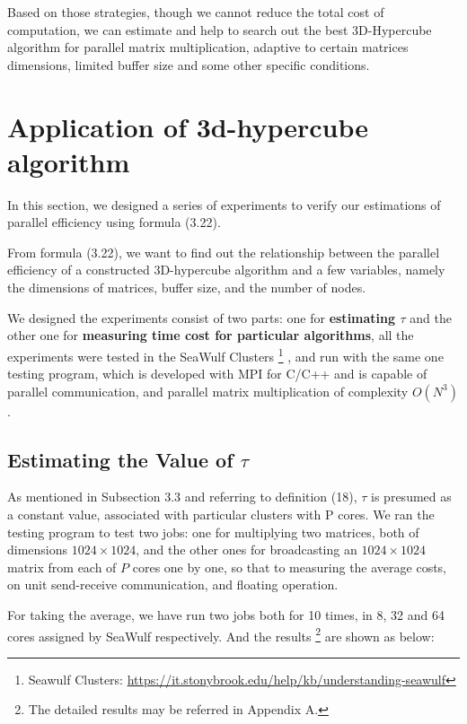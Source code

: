 \documentclass{amsart}
\theoremstyle{definition}
\theoremstyle{remark}
\numberwithin{equation}{section}
\begin{document}
\par
Based on those strategies, though we cannot reduce the total cost of computation, we can estimate and help to search out the best 3D-Hypercube algorithm for parallel matrix multiplication, adaptive to certain matrices dimensions, limited buffer size and some other specific conditions.\par


\section{Application of 3d-hypercube algorithm}
	In this section, we designed a series of experiments to verify our estimations of parallel efficiency using formula (3.22).\par
	From formula (3.22), we want to find out the relationship between the parallel efficiency of a constructed 3D-hypercube algorithm and a few variables, namely the dimensions of matrices, buffer size, and the number of nodes.\par
	We designed the experiments consist of two parts: one for \textbf{estimating $\tau$} and the other one for \textbf{measuring time cost for particular algorithms}, all the experiments were tested in the SeaWulf Clusters%
\footnote{Seawulf Clusters: \url{https://it.stonybrook.edu/help/kb/understanding-seawulf}}%
, and run with the same one testing program, which is developed with MPI for C/C++ and is capable of parallel communication, and parallel matrix multiplication of complexity $O(N^3)$.\par

\subsection{Estimating the Value of \textbf{$\tau$}}
	As mentioned in Subsection 3.3 and referring to definition (18), $\tau$ is presumed as a constant value, associated with particular clusters with P cores. We ran the testing program to test two jobs: one for multiplying two matrices, both of dimensions $1024\times 1024$, and the other ones for broadcasting an $1024\times 1024$ matrix from each of $P$ cores one by one, so that to measuring the average costs, on unit send-receive communication, and floating operation.\par
	For taking the average, we have run two jobs both for 10 times, in 8, 32 and 64 cores assigned by SeaWulf
respectively. And the results%
\footnote{The detailed results may be referred in Appendix A.}%
 are shown as below:\par
\end{document}
